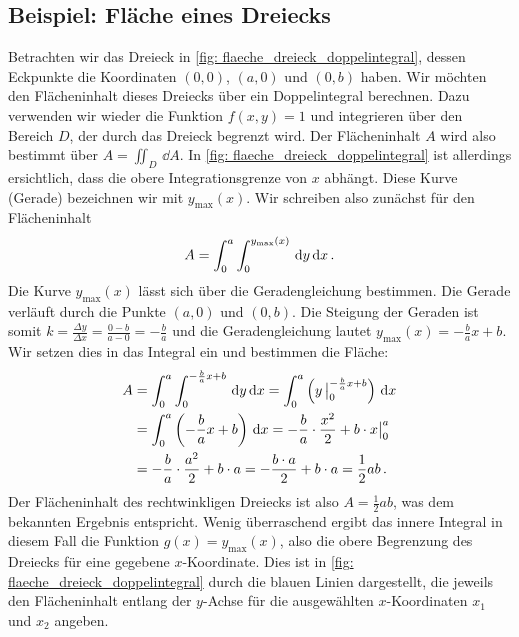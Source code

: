 \subsection{Beispiel: Fläche eines Dreiecks}\label{sec: flaeche_dreieck_doppelintegral}
Betrachten wir das Dreieck in \cref{fig: flaeche_dreieck_doppelintegral}, dessen Eckpunkte die Koordinaten $(0,0)$, $(a,0)$ und $(0,b)$ haben. Wir möchten den Flächeninhalt dieses Dreiecks über ein Doppelintegral berechnen. Dazu verwenden wir wieder die Funktion $f(x,y) = 1$ und integrieren über den Bereich $D$, der durch das Dreieck begrenzt wird. Der Flächeninhalt $A$ wird also bestimmt über $A = \iint_{D} \,\dd A$. In \cref{fig: flaeche_dreieck_doppelintegral} ist allerdings ersichtlich, dass die obere Integrationsgrenze von $x$ abhängt. Diese Kurve (Gerade) bezeichnen wir mit $y_{\text{max}}(x)$. Wir schreiben also zunächst für den Flächeninhalt
\begin{equation}
    A = \int_{0}^{a} \int_{0}^{y_{\text{max}}(x)} \,\mathrm{d} y \,\mathrm{d} x \,.
\end{equation}
Die Kurve $y_{\text{max}}(x)$ lässt sich über die Geradengleichung bestimmen. Die Gerade verläuft durch die Punkte $(a,0)$ und $(0,b)$. Die Steigung der Geraden ist somit $k = \frac{\Delta y}{\Delta x} = \frac{0-b}{a-0} = -\frac{b}{a}$ und die Geradengleichung lautet $y_{\text{max}}(x) = -\frac{b}{a}x + b$. Wir setzen dies in das Integral ein und bestimmen die Fläche:
\begin{align*}
    A &= \int_{0}^{a} \int_{0}^{-\frac{b}{a}x + b} \,\mathrm{d} y \,\mathrm{d} x = \int_{0}^{a} \left( y\, \big |_{0}^{-\frac{b}{a}x + b} \right) \,\mathrm{d} x \\
    &= \int_{0}^{a} \left( -\frac{b}{a}x + b \right) \,\mathrm{d} x = -\frac{b}{a} \cdot \frac{x^2}{2} + b \cdot x \big |_{0}^{a} \\
    &= -\frac{b}{a} \cdot \frac{a^2}{2} + b \cdot a = -\frac{b\cdot a}{2} + b\cdot a = \frac{1}{2}ab \,.
\end{align*}
Der Flächeninhalt des rechtwinkligen Dreiecks ist also $A = \frac{1}{2}ab$, was dem bekannten Ergebnis entspricht. Wenig überraschend ergibt das innere Integral in diesem Fall die Funktion $g(x) = y_{\text{max}}(x)$, also die obere Begrenzung des Dreiecks für eine gegebene $x$-Koordinate. Dies ist in \cref{fig: flaeche_dreieck_doppelintegral} durch die blauen Linien dargestellt, die jeweils den Flächeninhalt entlang der $y$-Achse für die ausgewählten $x$-Koordinaten $x_1$ und $x_2$ angeben.
